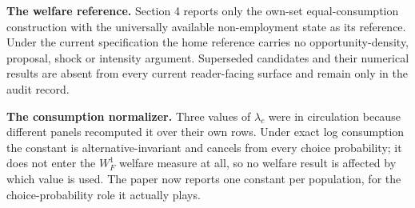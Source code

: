 \documentclass[11pt,a4paper]{article}
\begin{document}
\textbf{The welfare reference.} Section 4 reports only the own-set equal-consumption construction with the universally available non-employment state as its reference. Under the current specification the home reference carries no opportunity-density, proposal, shock or intensity argument. Superseded candidates and their numerical results are absent from every current reader-facing surface and remain only in the audit record.

\textbf{The consumption normalizer.} Three values of \(\lambda_c\) were in circulation because different panels recomputed it over their own rows. Under exact log consumption the constant is alternative-invariant and cancels from every choice probability; it does not enter the \(W^1_F\) welfare measure at all, so no welfare result is affected by which value is used. The paper now reports one constant per population, for the choice-probability role it actually plays.



\end{document}
